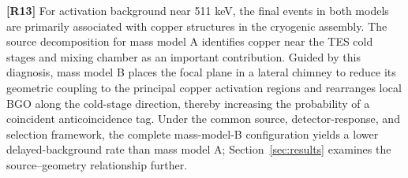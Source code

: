 \documentclass[11pt]{article}
\begin{document}
\begingroup
\color{revisionblue}
\noindent\textbf{[R13]} For activation background near 511 keV, the final
events in both models are primarily associated with copper structures in the
cryogenic assembly. The source decomposition for mass model A identifies
copper near the TES cold stages and mixing chamber as an important
contribution. Guided by this diagnosis, mass model B places the focal plane in
a lateral chimney to reduce its geometric coupling to the principal copper
activation regions and rearranges local BGO along the cold-stage direction,
thereby increasing the probability of a coincident anticoincidence tag. Under
the common source, detector-response, and selection framework, the complete
mass-model-B configuration yields a lower delayed-background rate than mass
model A; Section~\ref{sec:results} examines the source--geometry relationship
further.
\endgroup
\end{document}
